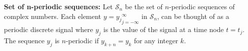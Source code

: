 {\bf Set of n-periodic sequences:} Let $\mathcal{S}_n$ be the set of $n$-periodic sequences of complex numbers. Each element $y={y_j}_{j=-\infty}^{\infty}$ in $\mathcal{S}_n$, can be thought of as a periodic discrete signal where $y_j$ is the value of the signal at a time node $t=t_j$. The sequence $y_j$ is $n$-periodic if $y_{k+n}=y_k$ for any integer $k$.